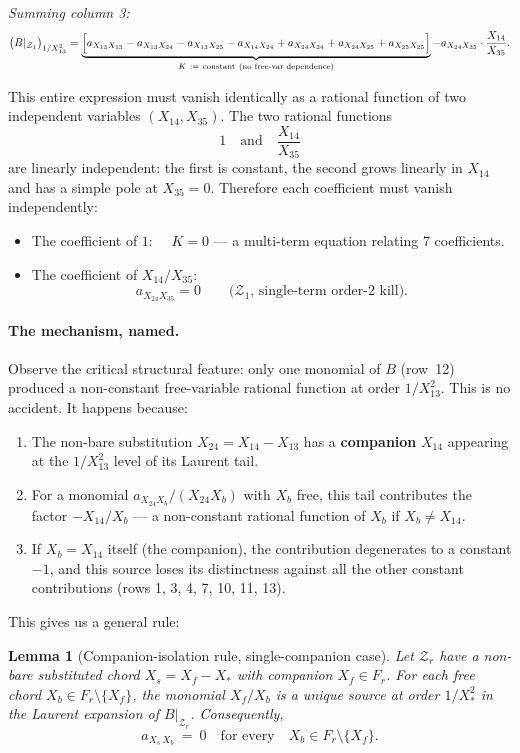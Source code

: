\documentclass[11pt]{article}
\newcommand{\X}[2]{X_{#1#2}}
\newcommand{\Z}{\mathcal{Z}}
\newtheorem{lemma}{Lemma}
\theoremstyle{definition}
\begin{document}
\emph{Summing column 3:}
\[
\bigl(B|_{\Z_1}\bigr)_{1/\X{1}{3}^2}
= \underbrace{\Bigl[a_{\X{1}{3}\X{1}{3}} - a_{\X{1}{3}\X{2}{4}} - a_{\X{1}{3}\X{2}{5}} - a_{\X{1}{4}\X{2}{4}} + a_{\X{2}{4}\X{2}{4}} + a_{\X{2}{4}\X{2}{5}} + a_{\X{2}{5}\X{2}{5}}\Bigr]}_{K\ :=\ \text{constant}\ (\text{no free-var dependence})} - a_{\X{2}{4}\X{3}{5}}\cdot\frac{\X{1}{4}}{\X{3}{5}}.
\]

This entire expression must vanish identically as a rational function of
two independent variables $(\X{1}{4},\X{3}{5})$. The two rational functions
\[
1 \quad\text{and}\quad \frac{\X{1}{4}}{\X{3}{5}}
\]
are linearly independent: the first is constant, the second grows linearly
in $\X{1}{4}$ and has a simple pole at $\X{3}{5}=0$. Therefore each
coefficient must vanish independently:
\begin{itemize}[nosep,leftmargin=2em]
\item The coefficient of $1$: $\quad K = 0$ --- a multi-term equation
relating $7$ coefficients.
\item The coefficient of $\X{1}{4}/\X{3}{5}$:
\[
\boxed{a_{\X{2}{4}\X{3}{5}}=0\qquad\text{($\Z_1$, single-term order-2 kill).}}
\]
\end{itemize}

\paragraph{The mechanism, named.} Observe the critical structural feature:
only one monomial of $B$ (row~12) produced a non-constant free-variable
rational function at order $1/\X{1}{3}^2$. This is no accident. It happens
because:
\begin{enumerate}[nosep,leftmargin=2em]
\item The non-bare substitution $\X{2}{4}=\X{1}{4}-\X{1}{3}$ has a
\textbf{companion} $\X{1}{4}$ appearing at the $1/\X{1}{3}^2$ level of
its Laurent tail.
\item For a monomial $a_{\X{2}{4}X_b}/(\X{2}{4}X_b)$ with $X_b$ free, this
tail contributes the factor $-\X{1}{4}/X_b$ --- a non-constant rational
function of $X_b$ if $X_b\ne \X{1}{4}$.
\item If $X_b = \X{1}{4}$ itself (the companion), the contribution degenerates
to a constant $-1$, and this source loses its distinctness against
all the other constant contributions (rows 1, 3, 4, 7, 10, 11, 13).
\end{enumerate}

This gives us a general rule:

\begin{lemma}[Companion-isolation rule, single-companion case]
\label{lem:companion-isolation-simple}
Let $\Z_r$ have a non-bare substituted chord $X_s = X_f - X_*$ with
companion $X_f \in F_r$. For each free chord $X_b \in F_r \setminus \{X_f\}$,
the monomial $X_f/X_b$ is a unique source at order $1/X_*^{2}$ in the
Laurent expansion of $B|_{\Z_r}$. Consequently,
\[
a_{X_s\,X_b}\ =\ 0\quad\text{for every}\quad X_b \in F_r\setminus\{X_f\}.
\]
\end{lemma}
\end{document}
